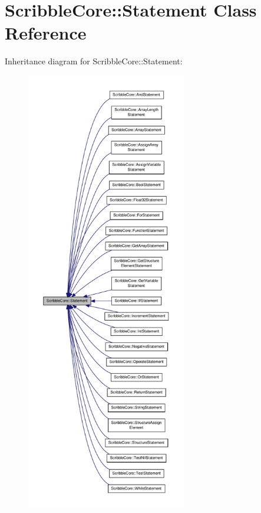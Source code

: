 \hypertarget{class_scribble_core_1_1_statement}{\section{Scribble\-Core\-:\-:Statement Class Reference}
\label{class_scribble_core_1_1_statement}
}


Inheritance diagram for Scribble\-Core\-:\-:Statement\-:
\nopagebreak
\begin{figure}[H]
\begin{center}
\leavevmode
\includegraphics[height=550pt]{class_scribble_core_1_1_statement__inherit__graph}
\end{center}
\end{figure}
